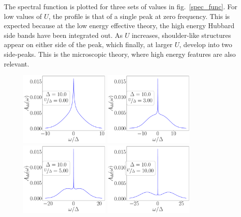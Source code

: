 The spectral function is plotted for three sets of values in fig.~\ref{spec_func}. For low values of \(U\), the profile is that of a single peak at zero frequency. This is expected because at the low energy effective theory, the high energy Hubbard side bands have been integrated out. As \(U\) increases, shoulder-like structures appear on either side of the peak, which finally, at larger \(U\), develop into two side-peaks. This is the microscopic theory, where high energy features are also relevant.
\begin{figure}[!htb]
	\centering
	\includegraphics[width=0.4\textwidth]{../figures/spec_func_Ub=0_U_by_delta=0.00.pdf}
	\includegraphics[width=0.4\textwidth]{../figures/spec_func_Ub=0_U_by_delta=3.00.pdf}
	\includegraphics[width=0.4\textwidth]{../figures/spec_func_Ub=0_U_by_delta=5.00.pdf}
	\includegraphics[width=0.4\textwidth]{../figures/spec_func_Ub=0_U_by_delta=10.00.pdf}

\end{figure}
